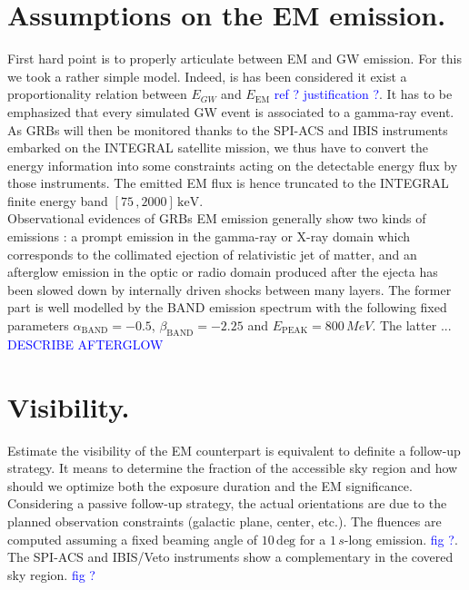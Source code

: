 \documentclass[a0,portrait]{a0poster}
\begin{document}
\begin{multicols}{2}
\section*{Assumptions on the EM emission.}

\indent First hard point is to properly articulate between EM and GW emission. For this we took a rather simple model. Indeed, is has been considered it exist a proportionality relation between $E_{GW}$ and $E_{\mathrm{EM}}$ \textcolor{blue}{ref ? justification ?}.
It has to be emphasized that every simulated GW event is associated to a gamma-ray event. As GRBs will then be monitored thanks to the SPI-ACS and IBIS instruments embarked on the \textsc{INTEGRAL} satellite mission, we thus have to convert the energy information into some constraints acting on the detectable energy flux by those instruments. The emitted EM flux is hence truncated to the \textsc{INTEGRAL} finite energy band $\left[ 75 \, , 2000 \right] \, \mathrm{keV}$. \\
\indent Observational evidences of GRBs EM emission generally show two kinds of emissions : a prompt emission in the gamma-ray or X-ray domain which corresponds to the collimated ejection of relativistic jet of matter, and an afterglow emission in the optic or radio domain produced after the ejecta has been slowed down by internally driven shocks between many layers. The former part is well modelled by the BAND emission spectrum with the following fixed parameters $\alpha_{\mathrm{BAND}} = - 0.5$, $\beta_{\mathrm{BAND}} = - 2.25$ and $E_{\mathrm{PEAK}} = 800 \, MeV$. The latter ... \textcolor{blue}{DESCRIBE AFTERGLOW}

\section*{Visibility.}

Estimate the visibility of the EM counterpart is equivalent to definite a follow-up strategy. It means to determine the fraction of the accessible sky region and how should we optimize both the exposure duration and the EM significance. \\
Considering a passive follow-up strategy, the actual orientations are due to the planned observation constraints (galactic plane, center, etc.). The fluences are computed assuming a fixed beaming angle of $10 \, \mathrm{deg}$ for a $1 \, s$-long emission. \textcolor{blue}{fig ?}. The SPI-ACS and IBIS/Veto instruments show a complementary in the covered sky region. \textcolor{blue}{fig ?}



\end{multicols}
\end{document}
